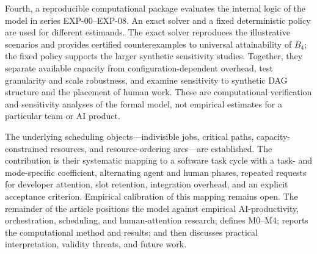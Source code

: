 Fourth, a reproducible computational package evaluates the internal logic of
the model in series EXP-00--EXP-08. An exact solver and a fixed deterministic
policy are used for different estimands. The exact solver reproduces the
illustrative scenarios and provides certified counterexamples to universal
attainability of $B_4$; the fixed policy supports the larger synthetic
sensitivity studies. Together, they separate available capacity from
configuration-dependent overhead, test granularity and scale robustness, and
examine sensitivity to synthetic DAG structure and the placement of human work.
These are computational verification and sensitivity analyses of the formal
model, not empirical estimates for a particular team or AI product.

The underlying scheduling objects---indivisible jobs, critical paths,
capacity-constrained resources, and resource-ordering arcs---are established.
The contribution is their systematic mapping to a software task cycle with a
task- and mode-specific coefficient, alternating agent and human phases,
repeated requests for developer attention, slot retention, integration
overhead, and an explicit acceptance criterion. Empirical calibration of this
mapping remains open. The remainder of the article positions the model against
empirical AI-productivity, orchestration, scheduling, and human-attention
research; defines M0--M4; reports the computational method and results; and
then discusses practical interpretation, validity threats, and future work.
